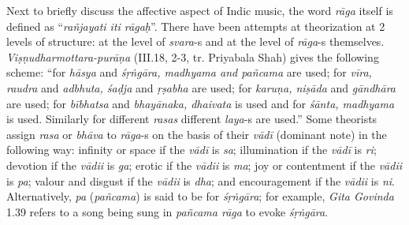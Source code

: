 Next to briefly discuss the affective aspect of Indic music, the word \textsl{rāga} itself is defined as “\textsl{rañjayati iti rāgaḥ}”. There have been attempts at theorization at 2 levels of structure: at the level of \textsl{svara}-s and at the level of \textsl{rāga}-s themselves. \textsl{Viṣṇudharmottara-purāṇa} (III.18, 2-3, tr. Priyabala Shah) gives the following scheme: “for \textsl{hāsya} and \textsl{śṛṅgāra, madhyama and pañcama} are used; for \textsl{vīra, raudra} and \textsl{adbhuta, śaḍja} and \textsl{ṛṣabha} are used; for \textsl{karuṇa, niṣāda} and \textsl{gāndhāra} are used; for \textsl{bībhatsa} and \textsl{bhayānaka, dhaivata} is used and for \textsl{śānta, madhyama} is used. Similarly for different \textsl{rasas} different \textsl{laya}-s are used.” Some theorists assign \textsl{rasa} or \textsl{bhāva} to \textsl{rāga}-s on the basis of their \textsl{vādī} (dominant note) in the following way: infinity or space if the \textsl{vādī} is \textsl{sa}; illumination if the \textsl{vādī} is \textsl{ri}; devotion if the \textsl{vādii} is \textsl{ga}; erotic if the \textsl{vādii} is \textsl{ma}; joy or contentment if the \textsl{vādii} is \textsl{pa}; valour and disgust if the \textsl{vādii} is \textsl{dha}; and encouragement if the \textsl{vādii} is \textsl{ni}. Alternatively, \textsl{pa} (\textsl{pañcama}) is said to be for \textsl{śṛṅgāra}; for example, \textsl{Gita Govinda} 1.39 refers to a song being sung in \textsl{pañcama rāga} to evoke \textsl{śṛṅgāra}.

